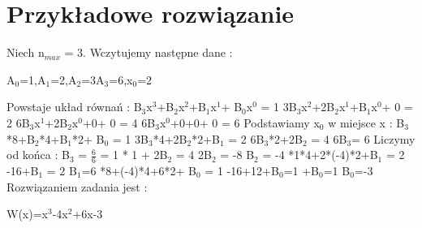 \documentclass[11pt]{article}
\begin{document}
\section{Przykładowe rozwiązanie}
Niech n$_{max}$ = 3. Wczytujemy następne dane : \newline
\centerline{A$_{0}$=1,A$_{1}$=2,A$_{2}$=3A$_{3}$=6,x$_{0}$=2}
\newline \newline Powstaje układ równań : \newline 
B$_{3}$x$^{3}$+B$_{2}$x$^{2}$+B$_{1}$x$^{1}$+ B$_{0}$x$^{0}$ = 1 \newline
3B$_{3}$x$^{2}$+2B$_{2}$x$^{1}$+B$_{1}$x$^{0}$+ 0 = 2 \newline 
6B$_{3}$x$^{1}$+2B$_{2}$x$^{0}$+0+ 0 = 4 \newline
6B$_{3}$x$^{0}$+0+0+ 0 = 6 \newline \newline 
Podstawiamy x$_{0}$ w miejsce x : \newline
B$_{3}$*8+B$_{2}$*4+B$_{1}$*2+ B$_{0}$ = 1 \newline
3B$_{3}$*4+2B$_{2}$*2+B$_{1}$ = 2 \newline 
6B$_{3}$*2+2B$_{2}$ = 4 \newline
6B$_{3}$= 6 \newline \newline 
Liczymy od końca : \newline
B$_{3}$ = $\frac {6}{6}$ = 1  * 1 + 2B$_{2}$ = 4 \newline
2B$_{2}$ = -8 \newline
B$_{2}$ = -4 *1*4+2*(-4)*2+B$_{1}$ = 2 -16+B$_{1}$ = 2 \newline
B$_{1}$=6 *8+(-4)*4+6*2+ B$_{0}$ = 1 -16+12+B$_{0}$=1 +B$_{0}$=1 \newline
B$_{0}$=-3 \newline
\newline
Rozwiązaniem zadania jest : \newline
\centerline {W(x)=x$^{3}$-4x$^{2}$+6x-3}
\end{document}
